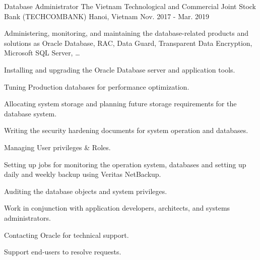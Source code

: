 \begin{cventries}
  \cventry
    {Database Administrator} %
    {The Vietnam Technological and Commercial Joint Stock Bank (TECHCOMBANK)} %
    {Hanoi, Vietnam} %
    {Nov. 2017 - Mar. 2019} %
    {
      \begin{cvitems} %
        \item {Administering, monitoring, and maintaining the database-related products and solutions as Oracle Database, RAC, Data Guard, Transparent Data Encryption, Microsoft SQL Server, …}
        \item {Installing and upgrading the Oracle Database server and application tools.}
        \item {Tuning Production databases for performance optimization.}
        \item {Allocating system storage and planning future storage requirements for the database system.}
        \item {Writing the security hardening documents for system operation and databases.}
        \item {Managing User privileges \& Roles.}
        \item {Setting up jobs for monitoring the operation system, databases and setting up daily and weekly backup using Veritas NetBackup.}
        \item {Auditing the database objects and system privileges.}
        \item {Work in conjunction with application developers, architects, and systems administrators.}
        \item {Contacting Oracle for technical support.}
        \item {Support end-users to resolve requests.}
      \end{cvitems}
    }


\end{cventries}

